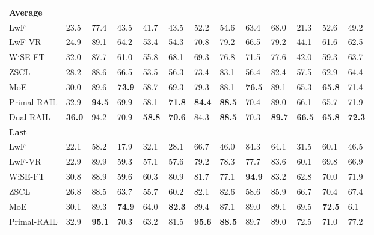 \documentclass{article}
\begin{document}
\begin{table}
\begin{tabular}{b{6.4em}b{1.6em}b{1.6em}b{1.6em}b{1.6em}b{1.6em}b{1.6em}b{1.6em}b{1.6em}b{1.6em}b{1.6em}b{1.6em}>{\centering\arraybackslash}m{3em}}
    \midrule
        \multicolumn{11}{l}{\textbf{Average}}\\
          \quad LwF& 23.5 & 77.4 & 43.5 & 41.7 & 43.5 & 52.2 & 54.6 & 63.4 & 68.0 & 21.3 & 52.6 & {\cellcolor{lightgrey}}49.2\\
          \quad LwF-VR& 24.9 & 89.1 & 64.2 & 53.4 & 54.3 & 70.8 & 79.2 & 66.5 & 79.2 & 44.1 & 61.6 & {\cellcolor{lightgrey}}62.5\\
          \quad WiSE-FT& 32.0 & 87.7 & 61.0 & 55.8 & 68.1 & 69.3 & 76.8 & 71.5 & 77.6 & 42.0 & 59.3 & {\cellcolor{lightgrey}}63.7\\
          \quad ZSCL& 28.2 & 88.6 & 66.5 & 53.5 & 56.3 & 73.4 & 83.1 & 56.4 & 82.4 & 57.5 & 62.9 & {\cellcolor{lightgrey}}64.4\\
          \quad MoE & 30.0 & 89.6 & \textbf{73.9} & 58.7 & 69.3 & 79.3 & 88.1 & \textbf{76.5} & 89.1 & 65.3 & \textbf{65.8} & {\cellcolor{lightgrey}}71.4\\
          \quad Primal-RAIL & 32.9 &\textbf{94.5}	&69.9 &58.1& \textbf{71.8} &\textbf{84.4} &\textbf{88.5} &70.4 &89.0 &66.1 & 65.7 & {\cellcolor{lightgrey}}71.9\\
          \quad Dual-RAIL & \textbf{36.0}& 94.2 &	70.9& \textbf{58.8}& \textbf{70.6} &84.3& \textbf{88.5} & 70.3&	\textbf{89.7}&	\textbf{66.5} &\textbf{65.8} & {\cellcolor{lightgrey}}\textbf{72.3}
 \\
    \midrule
        \multicolumn{11}{l}{\textbf{Last}}\\
          \quad LwF& 22.1 & 58.2 & 17.9 & 32.1 & 28.1 & 66.7 & 46.0 & 84.3 & 64.1 & 31.5 & 60.1 & {\cellcolor{lightgrey}}46.5\\
          \quad LwF-VR& 22.9 & 89.9 & 59.3 & 57.1 & 57.6 & 79.2 & 78.3 & 77.7 & 83.6 & 60.1 & 69.8 & {\cellcolor{lightgrey}}66.9\\
          \quad WiSE-FT& 30.8 & 88.9 & 59.6 & 60.3 & 80.9 & 81.7 & 77.1 & \textbf{94.9} & 83.2 & 62.8 & 70.0 & {\cellcolor{lightgrey}}71.9\\
          \quad ZSCL& 26.8 & 88.5 & 63.7 & 55.7 & 60.2 & 82.1 & 82.6 & 58.6 & 85.9 & 66.7 & 70.4 & {\cellcolor{lightgrey}}67.4\\
          \quad MoE & 30.1 &89.3 &\textbf{74.9} &64.0 &\textbf{82.3} &89.4 & 87.1 &89.0 &89.1 &69.5 &\textbf{72.5} & 7{\cellcolor{lightgrey}}6.1\\
          \quad Primal-RAIL & 32.9	&\textbf{95.1}	&70.3	&63.2	&81.5	&\textbf{95.6}	&\textbf{88.5}&	89.7	&89.0	&72.5	&71.0 & {\cellcolor{lightgrey}}77.2\\

\end{tabular}
\end{table}
\end{document}
